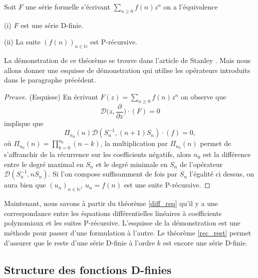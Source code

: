 \documentclass[a4paper,10pt]{article}
\begin{document}
	\begin{theorem}
		Soit $F$ une série formelle s'écrivant $\sum_{n \geq 0} f(n)z^n$ on a l'équivalence
		
		(i) $F$ est une série D-finie.
		
		(ii) La suite $(f(n))_{n\in \mathbb{N}}$ est P-récursive.
		
		\label{diff_req}
		
	\end{theorem}
	
	
	 La démonstration de ce théorème se trouve dans l'article de Stanley \cite{stanley1980differentiably}. Mais nous allons donner une esquisse de démonstration qui utilise les opérateurs introduits dans le paragraphe précédent.
	 
	 \begin{proof}[Preuve] (Esquisse)
	 	En écrivant $F(z)=\sum_{n \geq 0} f(n)z^n$ on observe que
	 	\[\mathcal{D}\big(z,\frac{\partial}{\partial z}\big)\cdot (F)=0\]
	 	implique que  
	 	\[\Pi_{n_0}(n)\mathcal{D}(S_n^{-1},(n+1)S_n)\cdot (f) =0,\]
	 	 où $\Pi_{n_0}(n)=\prod_{k=0}^{n_0}(n-k)$, la multiplication par $\Pi_{n_0}(n)$ permet de s'affranchir de la récurrence sur les coefficients négatifs, alors $n_0$ est la différence entre le degré maximal en $S_n$ et le degré minimale en $S_n$ de l'opérateur $\mathcal{D}(S_n^{-1},nS_n)$. Si l'on compose suffisamment de fois par $S_n$ l'égalité ci dessus, on aura bien que $(u_n)_{n \in \mathbb{N}}$, $u_n=f(n)$ est une suite P-récursive.
	 \end{proof}

	Maintenant, nous savons à partir du théorème \ref{diff_req} qu'il y a une correspondance entre les équations différentielles linéaires à coefficients polynomiaux et les suites P-récursive. L'esquisse de la démonstration est une méthode pour passer d'une formulation à l'autre. Le théorème \ref{rec_rest} permet d'assurer que le reste d'une série D-finie à l'ordre $k$ est encore une série D-finie.
	
	\subsection{Structure des fonctions D-finies}
	
\end{document}
